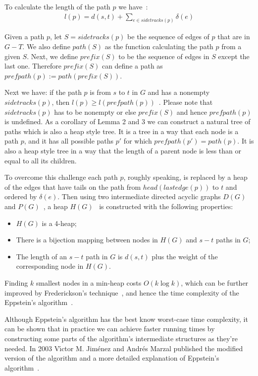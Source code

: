 To calculate the length of the path $p$ we have~\cite[Lemma 2]{eppstein1998finding}:
\begin{align}
  l(p) = d(s, t) + \sum_{e \in sidetracks(p)} \delta(e)
\end{align}

Given a path $p$, let $S = sidetracks(p)$ be the sequence of edges of $p$ that are in $G - T$. We also define $path(S)$ as the function calculating the path $p$ from a given $S$. Next, we define $prefix(S)$ to be the sequence of edges in $S$ except the last one. Therefore $prefix(S)$ can define a path as $prefpath(p) := path(prefix(S))$.

Next we have: if the path $p$ is from $s$ to $t$ in $G$ and has a nonempty $sidetracks(p)$, then $l(p) \geq l(prefpath(p))$~\cite[Lemma 3]{eppstein1998finding}. Please note that $sidetracks(p)$ has to be nonempty or else $prefix(S)$ and hence $prefpath(p)$ is undefined. As a corollary of Lemma 2 and 3 we can construct a natural tree of paths which is also a heap style tree. It is a tree in a way that each node is a path $p$, and it has all possible paths $p'$ for which $prefpath(p') = path(p)$. It is also a heap style tree in a way that the length of a parent node is less than or equal to all its children.

To overcome this challenge each path $p$, roughly speaking, is replaced by a heap of the edges that have tails on the path from $head(lastedge(p))$ to $t$ and ordered by $\delta(e)$. Then using two intermediate directed acyclic graphs $D(G)$~\cite[Lemma 4]{eppstein1998finding} and $P(G)$~\cite[Lemma 5]{eppstein1998finding}, a heap $H(G)$~\cite[Lemma 6]{eppstein1998finding} is constructed with the following properties:
\begin{itemize}
\item $H(G)$ is a 4-heap;
\item There is a bijection mapping between nodes in $H(G)$ and $s-t$ paths in $G$;
\item The length of an $s-t$ path in $G$ is $d(s,t)$ plus the weight of the corresponding node in $H(G)$.
\end{itemize}

Finding $k$ smallest nodes in a min-heap costs $O(k\log k)$, which can be further improved by Frederickson's technique~\cite{frederickson1993optimal}, and hence the time complexity of the Eppstein's algorithm~\cite[Lemma 7]{eppstein1998finding}.

Although Eppstein's algorithm has the best know worst-case time complexity, it can be shown that in practice we can achieve faster running times by constructing some parts of the algorithm's intermediate structures as they're needed. In 2003 V{\'\i}ctor M. Jim{\'e}nez and Andr{\'e}s Marzal published the modified version of the algorithm and a more detailed explanation of Eppstein's algorithm~\cite{jimenez2003lazy}.


